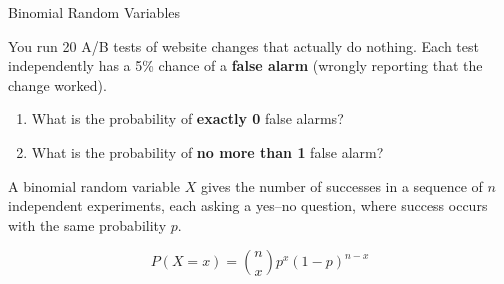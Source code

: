 \documentclass[10pt]{beamer}
\begin{document}
%
%
%
%
%
%	



\begin{frame}{Binomial Random Variables}
\small

\begin{myredbox}[title=\text{Problem (False Alarms in A/B Testing)}]
You run 20 A/B tests of website changes that actually do nothing.  Each test independently has a 5\% chance of a \textbf{false alarm} (wrongly reporting that the change worked).
\begin{enumerate}
	\item What is the probability of \textbf{exactly 0} false alarms?
	\item What is the probability of \textbf{no more than 1} false alarm?
\end{enumerate}
\end{myredbox}

\vfill


\vfill

\begin{mygreenbox}[title=\text{Tool: Binomial Random Variables}]
\footnotesize
A binomial random variable $X$ gives the number of successes in a sequence of $n$ independent experiments, each asking a yes--no question, where success occurs with the same probability $p$.

\[ P(X=x) = \binom{n}{x} p^x (1-p)^{n-x} \]
\end{mygreenbox}
\end{frame}
\end{document}
